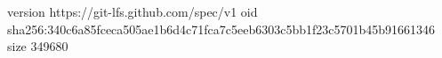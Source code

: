 version https://git-lfs.github.com/spec/v1
oid sha256:340c6a85fceca505ae1b6d4c71fca7c5eeb6303c5bb1f23c5701b45b91661346
size 349680
